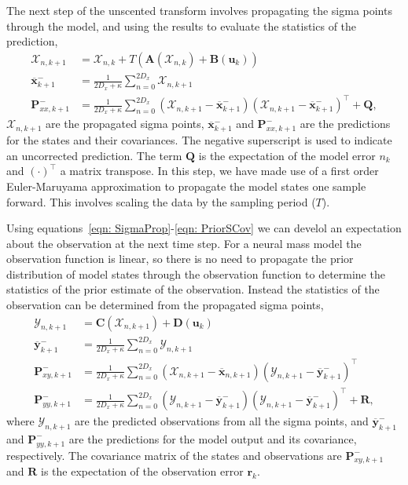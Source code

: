 The next step of the unscented transform involves propagating the sigma points through the model, and using the results to evaluate the statistics of the prediction,
\begin{align}\label{eqn: SigmaProp}%
\mathbf{\mathcal{X}}_{n,k+1} &= \mathbf{\mathcal{X}}_{n,k}+ T(\mathbf{A}(\mathbf{\mathcal{X}}_{n,k}) +\mathbf{B}(\mathbf{u}_{k}))\\
\label{eqn: PriorSMean}
\overline{\mathbf{x}}_{k+1}^{-} &= \frac{1}{2D_{x}+\kappa}\sum_{n=0}^{2D_{x}} \mathbf{\mathcal{X}}_{n,k+1}\\
\label{eqn: PriorSCov}
\mathbf{P}_{xx,k+1}^{-} &= \frac{1}{2D_{x}+\kappa}\sum_{n=0}^{2D_{x}} (\mathbf{\mathcal{X}}_{n,k+1} -\mathbf{\overline{x}}_{k+1}^{-})(\mathbf{\mathcal{X}}_{n,k+1}-\mathbf{\overline{x}}_{k+1}^{-})^{\top} + \mathbf{Q},%
\end{align} $\mathbf{\mathcal{X}}_{n,k+1}$ are the propagated sigma points, $\overline{\mathbf{x}}_{k+1}^{-}$ and $\mathbf{P}_{xx,k+1}^{-}$ are the predictions for the states and their covariances. The negative superscript is used to indicate an uncorrected prediction. The term $\mathbf{Q}$ is the expectation of the model error $n_{k}$ and $(\cdot)^{\top}$ a matrix transpose. In this step, we have made use of a first order Euler-Maruyama approximation to propagate the model states one sample forward. This involves scaling the data by the sampling period ($T$).

Using equations~\ref{eqn: SigmaProp}-\ref{eqn: PriorSCov} we can develol an expectation about the observation at the next time step. For a neural mass model the observation function is linear, so there is no need to propagate the prior distribution of model states through the observation function to determine the statistics of the prior estimate of the observation. Instead the statistics of the observation can be determined from the propagated sigma points,
\begin{align}
\mathbf{\mathcal{Y}}_{n,k+1} &= \mathbf{C}(\mathbf{\mathcal{X}}_{n,k+1})+ \mathbf{D}(\mathbf{u}_{k})\\
\overline{\mathbf{y}}_{k+1}^{-} &= \frac{1}{2D_{x}+\kappa}\sum_{n=0}^{2D_{x}} \mathbf{\mathcal{Y}}_{n,k+1}\\
\label{eqn: statecovg}
\mathbf{P}_{xy,k+1}^{-} &= \frac{1}{2D_{x}+\kappa}\sum_{n=0}^{2D_{x}} (\mathbf{\mathcal{X}}_{n,k+1}-\overline{\mathbf{x}}_{n,k+1}) (\mathbf{\mathcal{Y}}_{n,k+1}-\overline{\mathbf{y}}_{k+1}^{-})^{\top}\\
\mathbf{P}_{yy,k+1}^{-} &= \frac{1}{2D_{x}+\kappa}\sum_{n=0}^{2D_{x}} (\mathbf{\mathcal{Y}}_{n,k+1}-\overline{\mathbf{y}}_{k+1}^{-}) (\mathbf{\mathcal{Y}}_{n,k+1}-\overline{\mathbf{y}}_{k+1}^{-})^{\top} +\mathbf{R},%
\end{align} where $\mathbf{\mathcal{Y}}_{n,k+1}$ are the predicted observations from all the sigma points, and $\overline{\mathbf{y}}_{k+1}^{-}$ and $\mathbf{P}_{yy,k+1}^{-}$ are the predictions for the model output and its covariance, respectively. The covariance matrix of the states and observations are $\mathbf{P}_{xy,k+1}^{-}$ and $\mathbf{R}$ is the expectation of the observation error $\mathbf{r}_{k}$.

